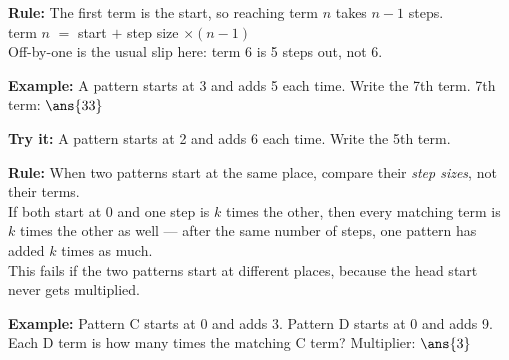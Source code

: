 \documentclass[12pt]{article}
\begin{document}


\begin{formulabox}
\textbf{Rule:} The first term is the start, so reaching term $n$ takes $n - 1$ steps.\\[3pt]
term $n$ $=$ start $+$ step size $\times (n - 1)$\\[3pt]
Off-by-one is the usual slip here: term 6 is 5 steps out, not 6.
\end{formulabox}

\begin{examplebox}
\textbf{Example:} \quad A pattern starts at 3 and adds 5 each time. Write the 7th term.
7th term: $\ans{33}$
\end{examplebox}

\begin{tryitbox}
\textbf{Try it:} \quad A pattern starts at 2 and adds 6 each time. Write the 5th term.\\[2pt]
\end{tryitbox}


\begin{formulabox}
\textbf{Rule:} When two patterns start at the same place, compare their \emph{step sizes}, not their terms.\\[3pt]
If both start at 0 and one step is $k$ times the other, then every matching term is $k$ times the other as well --- after the same number of steps, one pattern has added $k$ times as much.\\[3pt]
This fails if the two patterns start at different places, because the head start never gets multiplied.
\end{formulabox}

\begin{examplebox}
\textbf{Example:} \quad Pattern C starts at 0 and adds 3. Pattern D starts at 0 and adds 9. Each D term is how many times the matching C term?
Multiplier: $\ans{3}$
\end{examplebox}
\end{document}
